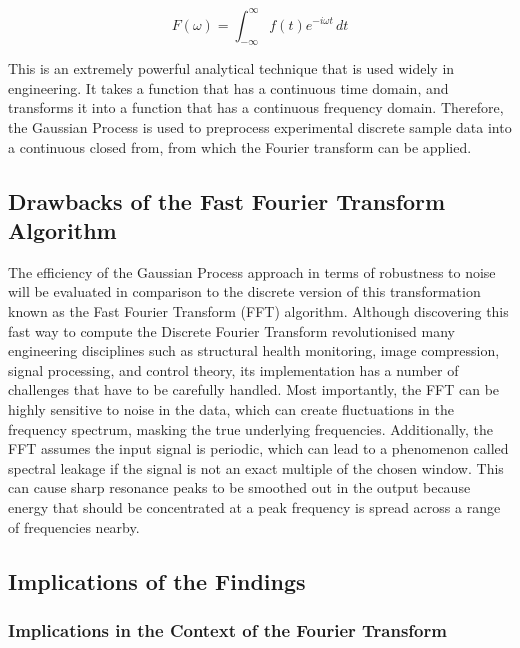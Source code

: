 \documentclass[12pt]{article}
\begin{document}
    \begin{equation}
        F(\omega) = \int_{-\infty}^{\infty} f(t) e^{-i \omega t} \, dt\label{eq:ft}
    \end{equation}

    This is an extremely powerful analytical technique that is used widely in engineering.
    It takes a function that has a continuous time domain, and transforms it into a function that has a continuous frequency domain.
    Therefore, the Gaussian Process is used to preprocess experimental discrete sample data into a continuous closed from, from which the Fourier transform can be applied.

    \subsection{Drawbacks of the Fast Fourier Transform Algorithm}
    The efficiency of the Gaussian Process approach in terms of robustness to noise will be evaluated in comparison to the discrete version of this transformation known as the Fast Fourier Transform (FFT) algorithm.
    Although discovering this fast way to compute the Discrete Fourier Transform revolutionised many engineering disciplines such as structural health monitoring, image compression, signal processing, and control theory\cite{Byjus2023}, its implementation has a number of challenges that have to be carefully handled.
    Most importantly, the FFT can be highly sensitive to noise in the data, which can create fluctuations in the frequency spectrum, masking the true underlying frequencies\cite{MathStackExchange2023}.
    Additionally, the FFT assumes the input signal is periodic, which can lead to a phenomenon called spectral leakage if the signal is not an exact multiple of the chosen window\cite{MathStackExchange2023}.
    This can cause sharp resonance peaks to be smoothed out in the output because energy that should be concentrated at a peak frequency is spread across a range of frequencies nearby.

    \subsection{Implications of the Findings}

    \subsubsection{Implications in the Context of the Fourier Transform}
\end{document}
